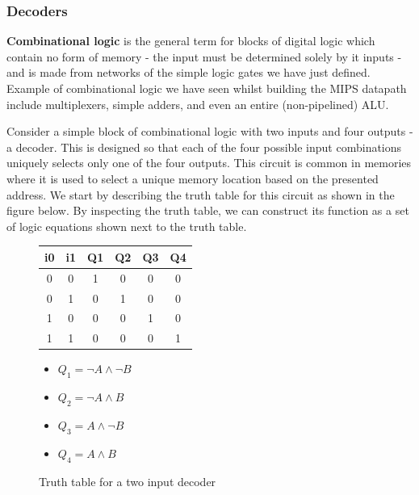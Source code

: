 \documentclass{article}
\begin{document}
	\subsubsection{Decoders}
	\par 
	\textbf{Combinational logic} is the general term for blocks of digital logic which contain no form of memory - the input must be determined solely by it inputs - and is made from networks of the simple logic gates we have just defined. Example of combinational logic we have seen whilst building the MIPS datapath include multiplexers, simple adders, and even an entire (non-pipelined) ALU.
	
	\par 
	Consider a simple block of combinational logic with two inputs and four outputs - a decoder. This is designed so that each of the four possible input combinations uniquely selects only one of the four outputs. This circuit is common in memories where it is used to select a unique memory location based on the presented address. We start by describing the truth table for this circuit as shown in the figure below. By inspecting the truth table, we can construct its function as a set of logic equations shown next to the truth table.
	\begin{figure}[h]
		\begin{minipage}[t]{.45\textwidth}
			\centering
			\begin{tabular}{c c | c c c c}
				i0 & i1 & Q1 & Q2 & Q3 & Q4  \\ \hline
				0 & 0 & 1 & 0 & 0 & 0 \\
				0 & 1 & 0 & 1 & 0 & 0 \\
				1 & 0 & 0 & 0 & 1 & 0 \\
				1 & 1 & 0 & 0 & 0 & 1
			\end{tabular}
			\caption{Truth table for a two input decoder}
			\label{fig:truth table two input decoder}
		\end{minipage}
		\hfill
		\begin{minipage}[t]{.45\textwidth}
			\begin{itemize}
				\item $Q_{1} = \neg A \wedge \neg B$
				\item $Q_{2} = \neg A \wedge B$
				\item $Q_{3} = A \wedge \neg B$
				\item $Q_{4} = A \wedge B$
			\end{itemize}
		\end{minipage}
	\end{figure}
	
\end{document}
